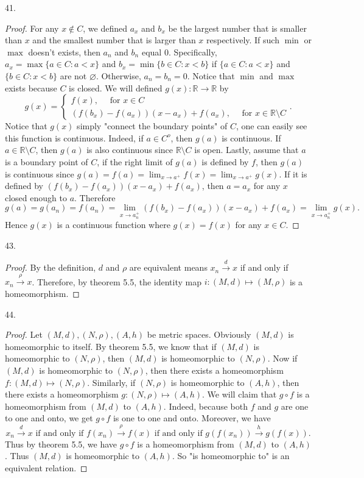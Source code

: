 \documentclass[12pt, a4paper]{article}
\theoremstyle{plain}
\newcommand{\R}{\mathbb{R}}
\begin{document}
41.
\begin{proof}
For any $x\notin C$, we defined $a_x$ and $b_x$ be the largest number that is smaller than $x$ and the smallest number that is larger than $x$ respectively. If such $\min$ or $\max$ doesn't exists, then $a_n$ and $b_n$ equal $0$. Specifically, $a_x=\max\{a\in C: a<x\}$ and $b_x=\min\{b\in C:x<b\}$ if $\{a\in C: a<x\}$ and $\{b\in C:x<b\}$ are not $\varnothing$. Otherwise, $a_n=b_n=0$. Notice that $\min$ and $\max$ exists because $C$ is closed. We will defined $g(x):\R\rightarrow\R$ by
\[
g(x)=\left\{\begin{array}{lr}
f(x),\quad \text{ for } x\in C\\
(f(b_x)-f(a_x))(x-a_x)+f(a_x),\quad \text{ for } x\in\R\setminus C
\end{array}\right..
\]
Notice that $g(x)$ simply "connect the boundary points" of $C$, one can easily see this function is continuous. Indeed, if $a\in C^o$, then $g(a)$ is continuous. If $a\in\R\setminus C$, then $g(a)$ is also continuous since $\R\setminus C$ is open. Lastly, assume that $a$ is a boundary point of $C$, if the right limit of $g(a)$ is defined by $f$, then $g(a)$ is continuous since $g(a)=f(a)=\lim_{x\rightarrow a^+}f(x)=\lim_{x\rightarrow a^+}g(x)$. If it is defined by $(f(b_x)-f(a_x))(x-a_x)+f(a_x)$, then $a=a_x$ for any $x$ closed enough to $a$. Therefore 
\[
g(a)=g(a_n)=f(a_n)=\lim_{x\rightarrow a_n^+}(f(b_x)-f(a_x))(x-a_x)+f(a_x)=\lim_{x\rightarrow a_n^+}g(x).
\]
Hence $g(x)$ is a continuous function where $g(x)=f(x)$ for any $x\in C$.
\end{proof}

43.
\begin{proof}
By the definition, $d$ and $\rho$ are equivalent means $x_n\xrightarrow{d}x$ if and only if $x_n\xrightarrow{\rho} x$. Therefore, by theorem 5.5, the identity map $i:(M,d)\mapsto (M,\rho)$ is a homeomorphism.
\end{proof}

44.
\begin{proof}
Let $(M,d), (N,\rho), (A,h)$ be metric spaces. Obviously $(M,d)$ is homeomorphic to itself. By theorem 5.5, we know that if $(M,d)$ is homeomorphic to $(N,\rho)$, then $(M,d)$ is homeomorphic to $(N,\rho)$. Now if $(M,d)$ is homeomorphic to $(N,\rho)$, then there exists a homeomorphism $f:(M,d)\mapsto (N,\rho)$. Similarly, if $(N,\rho)$ is homeomorphic to $(A,h)$, then there exists a homeomorphism $g:(N,\rho)\mapsto (A,h)$. We will claim that $g\circ f$ is a homeomorphism from $(M,d)$ to $(A,h)$. Indeed, because both $f$ and $g$ are one to one and onto, we get $g\circ f$ is one to one and onto. Moreover, we have 
\[
x_n\xrightarrow{d} x \text{ if and only if } f(x_n)\xrightarrow{\rho} f(x) \text{ if and only if }g(f(x_n))\xrightarrow{h} g(f(x)).
\]
Thus by theorem 5.5, we have $g\circ f$ is a homeomorphism from $(M,d)$ to $(A,h)$. Thus $(M,d)$ is homeomorphic to $(A,h)$. So "is homeomorphic to" is an equivalent relation.
\end{proof}
\end{document}
